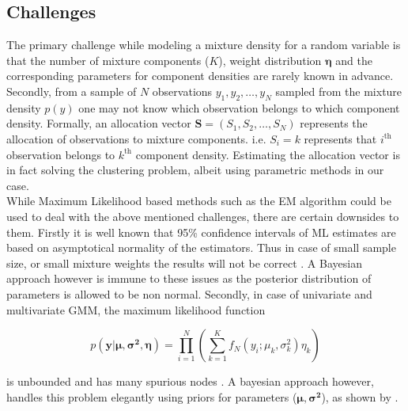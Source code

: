 \subsection{Challenges}
\label{subsec : challenges_mixture_density}
The primary challenge while modeling a mixture density for a random variable is that the number of mixture components ($K$), weight distribution $\boldsymbol{\eta}$ and the corresponding parameters for component densities are rarely known in advance. Secondly, from a sample of $N$ observations $y_1, y_2, \ldots, y_N$ sampled from the mixture density $p(y)$ one may not know which observation belongs to which component density. Formally, an allocation vector $\boldsymbol{S} = (S_1, S_2, \ldots, S_N)$ represents the allocation of observations to mixture components. i.e. $S_i = k$ represents that $i^\text{th}$ observation belongs to $k^\text{th}$ component density. Estimating the allocation vector is in fact solving the clustering problem, albeit using parametric methods in our case.\\

While Maximum Likelihood based methods such as the EM algorithm could be used to deal with the above mentioned challenges, there are certain downsides to them. Firstly it is well known that 95\% confidence intervals of ML estimates are based on asymptotical normality of the estimators. Thus in case of small sample size, or small mixture weights the results will not be correct \citep[pg. 35]{fruhwirth-schnatter_finite_2013}. A Bayesian approach however is immune to these issues as the posterior distribution of parameters is allowed to be non normal. Secondly, in case of univariate and multivariate GMM, the maximum likelihood function

$$ p(\boldsymbol{y}|\boldsymbol{\mu}, \boldsymbol{\sigma^2}, \boldsymbol{\eta}) = \prod_{i=1}^{N} (\sum_{k=1}^{K} f_N(y_i; \mu_k, \sigma^2_k) \eta_k)$$

is unbounded and has many spurious nodes \citep{kiefer_consistency_1956,day_estimating_1969}. A bayesian approach however, handles this problem elegantly using priors for parameters ($\boldsymbol{\mu}, \boldsymbol{\sigma^2}$), as shown by \citet[pg. 176]{fruhwirth-schnatter_finite_2013}.

